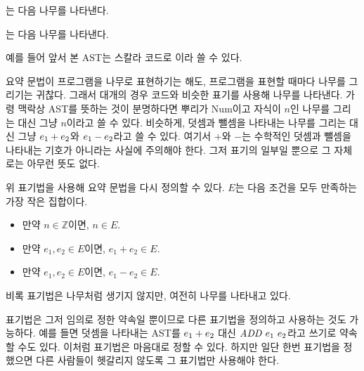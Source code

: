 는 다음 나무를 나타낸다.

\begin{center}
\end{center}

는 다음 나무를 나타낸다.

\begin{center}
\end{center}

예를 들어 앞서 본 AST는 스칼라 코드로 이라 쓸 수 있다.

요약 문법이 프로그램을 나무로 표현하기는 해도, 프로그램을 표현할 때마다 나무를
그리기는 귀찮다. 그래서 대개의 경우 코드와 비슷한 표기를 사용해 나무를 나타낸다.
가령 맥락상 AST를 뜻하는 것이 분명하다면 뿌리가 Num이고 자식이 $n$인 나무를
그리는 대신 그냥 $n$이라고 쓸 수 있다. 비슷하게, 덧셈과 뺄셈을 나타내는 나무를
그리는 대신 그냥 $e_1+e_2$와 $e_1-e_2$라고 쓸 수 있다. 여기서
$+$와 $-$는 수학적인 덧셈과 뺄셈을 나타내는 기호가 아니라는 사실에 주의해야
한다. 그저 표기의 일부일 뿐으로 그 자체로는 아무런 뜻도 없다.

위 표기법을 사용해  요약 문법을 다시 정의할 수 있다. $E$는 다음 조건을
모두 만족하는 가장 작은 집합이다.

\begin{itemize}
  \item 만약 $n\in\mathbb{Z}$이면, $n\in E$.
  \item 만약 $e_1,e_2\in E$이면, $e_1+e_2\in E$.
  \item 만약 $e_1,e_2\in E$이면, $e_1-e_2\in E$.
\end{itemize}

비록 표기법은 나무처럼 생기지 않지만, 여전히 나무를 나타내고 있다.

표기법은 그저 임의로 정한 약속일 뿐이므로 다른 표기법을 정의하고 사용하는 것도
가능하다. 예를 들면 덧셈을 나타내는 AST를 $e_1+e_2$ 대신 $\mbox{$\mathit{ADD}$}\
e_1\ e_2$라고 쓰기로 약속할 수도 있다. 이처럼 표기법은 마음대로 정할 수 있다.
하지만 일단 한번 표기법을 정했으면 다른 사람들이 헷갈리지 않도록 그 표기법만
사용해야 한다.

